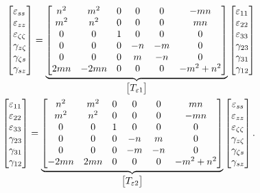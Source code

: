 \documentclass{AeroStructure-ERJohnson}
\begin{document}
\begin{align}
\left[\begin{array}{@{}l@{}} \varepsilon_{s s}\\
\varepsilon_{z z}\\
\varepsilon_{\zeta \zeta}\\
\gamma_{z \zeta}\\
\gamma_{\zeta s}\\
\gamma_{s z} \end{array}\right]=\underbrace{\left[\begin{array}{@{}cccccc@{}} n^{2} & m^{2} & 0 & 0 & 0 & -m n\\
m^{2} & n^{2} & 0 & 0 & 0 & m n\\
0 & 0 & 1 & 0 & 0 & 0\\
0 & 0 & 0 & -n & -m & 0\\
0 & 0 & 0 & m & -n & 0\\
2 m n & -2 m n & 0 & 0 & 0 & -m^{2}+n^{2} \end{array}\right]}_{\left[\begin{array}{@{}c@{}} T_{\varepsilon 1} \end{array}\right]}\left[\begin{array}{@{}l@{}} \varepsilon_{11}\\
\varepsilon_{22}\\
\varepsilon_{33}\\
\gamma_{23}\\
\gamma_{31}\\
\gamma_{12} \end{array}\right]\label{eq8.11}\\
\left[\begin{array}{@{}l@{}} \varepsilon_{11}\\
\varepsilon_{22}\\
\varepsilon_{33}\\
\gamma_{23}\\
\gamma_{31}\\
\gamma_{12}
\end{array}\right]=\underbrace{\left[\begin{array}{@{}cccccc@{}} n^{2} &
m^{2} & 0 & 0 & 0 & m n\\
m^{2} & n^{2} & 0 & 0 & 0 & -m n\\
0 &
0 & 1 & 0 & 0 & 0\\
0 & 0 & 0 & -n & m & 0\\
0 & 0 & 0 & -m & -n
& 0\\
-2 m n & 2 m n & 0 & 0 & 0 & -m^{2}+n^{2}
\end{array}\right]}_{\left[\begin{array}{@{}c@{}}
T_{\varepsilon 2}
\end{array}\right]}\left[\begin{array}{@{}c@{}} \varepsilon_{s s}\\
\varepsilon_{z z}\\
\varepsilon_{\zeta \zeta}\\
\gamma_{z
\zeta}\\
\gamma_{\zeta s}\\
\gamma_{s z} \end{array}\right].\label{eq8.12}
\end{align}
\end{document}

